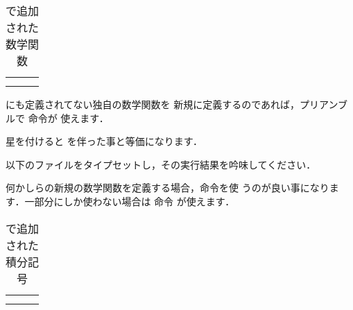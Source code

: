 \begin{table}[htbp]
\begin{scenter}
 \caption{で追加された数学関数}
 \begin{tabular}{LCC}
    &    &  \\[1ex]
 &  & \\
 \end{tabular}
\end{scenter}
\end{table}

にも定義されてない独自の数学関数を
新規に定義するのであれば，プリアンブルで 命令が
使えます．
\begin{Syntax}
\str*{}
\end{Syntax}
星を付けると を伴った事と等価になります．

\begin{Prob}
以下のファイルをタイプセットし，その実行結果を吟味してください．


何かしらの新規の数学関数を定義する場合，命令を使
うのが良い事になります．一部分にしか使わない場合は 命令
が使えます．
\end{Prob}

\begin{table}[htbp]
\begin{scenter}
 \caption{で追加された積分記号}
 \begin{tabular}{LCC}
 &  &  \\[1ex]
 &  & \\
 \end{tabular}
\end{scenter}
\end{table}

